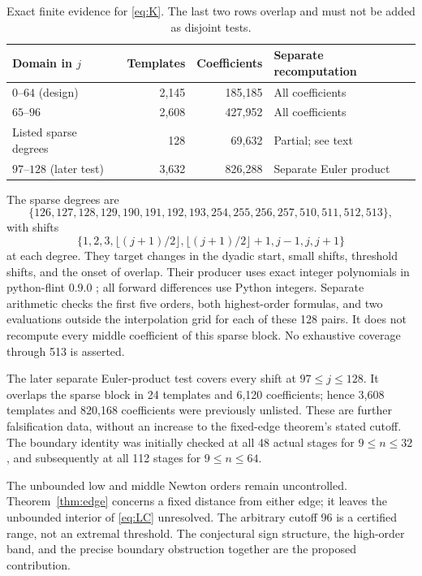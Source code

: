 \documentclass[11pt]{article}
\begin{document}
\begin{table}[ht]
\centering
\small
\begin{tabular}{lrrl}
\toprule
Domain in $j$ & Templates & Coefficients & Separate recomputation\\
\midrule
$0$--$64$ (design) & 2,145 & 185,185 & All coefficients\\
$65$--$96$ & 2,608 & 427,952 & All coefficients\\
Listed sparse degrees & 128 & 69,632 & Partial; see text\\
$97$--$128$ (later test) & 3,632 & 826,288 & Separate Euler product\\
\bottomrule
\end{tabular}
\caption{Exact finite evidence for \eqref{eq:K}. The last two rows
overlap and must not be added as disjoint tests.}\label{tab:tests}
\end{table}

The sparse degrees are
\[
 \{126,127,128,129,190,191,192,193,
   254,255,256,257,510,511,512,513\},
\]
with shifts
\[
 \{1,2,3,\lfloor(j+1)/2\rfloor,\lfloor(j+1)/2\rfloor+1,j-1,j,j+1\}
\]
at each degree. They target changes in the dyadic start, small shifts,
threshold shifts, and the onset of overlap. Their producer uses exact
integer polynomials in python-flint 0.9.0 \cite{PythonFlint}; all forward
differences use Python integers. Separate arithmetic checks the first
five orders, both highest-order formulas, and two evaluations outside
the interpolation grid for each of these 128 pairs. It does not
recompute every middle coefficient of this sparse block. No exhaustive
coverage through 513 is asserted.

The later separate Euler-product test covers every shift at
$97\leq j\leq128$. It overlaps the sparse block in 24 templates and
6,120 coefficients; hence 3,608 templates and 820,168 coefficients were
previously unlisted. These are further falsification data, without an
increase to the fixed-edge theorem's stated cutoff. The boundary
identity was initially checked at all 48 actual stages for $9\leq n\leq32$,
and subsequently at all 112 stages for $9\leq n\leq64$.

The unbounded low and middle Newton orders remain uncontrolled.
Theorem~\ref{thm:edge} concerns a fixed distance from either edge; it
leaves the unbounded interior of \eqref{eq:LC} unresolved. The arbitrary
cutoff 96 is a certified range, not an extremal threshold. The
conjectural sign structure, the high-order band, and the precise
boundary obstruction together are the proposed contribution.
\end{document}
